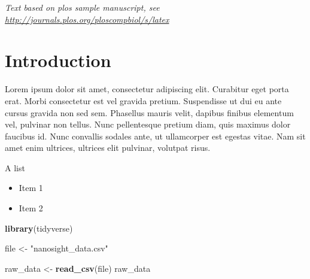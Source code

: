 \documentclass[10pt,letterpaper]{article}
\newenvironment{Shaded}{\begin{snugshade}}{\end{snugshade}}
\newcommand{\KeywordTok}[1]{\textcolor[rgb]{0.13,0.29,0.53}{\textbf{#1}}}
\newcommand{\StringTok}[1]{\textcolor[rgb]{0.31,0.60,0.02}{#1}}
\newcommand{\NormalTok}[1]{#1}
\providecommand{\tightlist}{%
  \setlength{\itemsep}{0pt}\setlength{\parskip}{0pt}}
\begin{document}
\linenumbers

\emph{Text based on plos sample manuscript, see
\url{http://journals.plos.org/ploscompbiol/s/latex}}

\section{Introduction}\label{introduction}

Lorem ipsum dolor sit amet, consectetur adipiscing elit. Curabitur eget
porta erat. Morbi consectetur est vel gravida pretium. Suspendisse ut
dui eu ante cursus gravida non sed sem. Phasellus mauris velit, dapibus
finibus elementum vel, pulvinar non tellus. Nunc pellentesque pretium
diam, quis maximus dolor faucibus id. Nunc convallis sodales ante, ut
ullamcorper est egestas vitae. Nam sit amet enim ultrices, ultrices elit
pulvinar, volutpat risus.

A list

\begin{itemize}
\tightlist
\item
  Item 1
\item
  Item 2
\end{itemize}

\begin{Shaded}
\begin{Highlighting}[]
\KeywordTok{library}\NormalTok{(tidyverse)}

\NormalTok{file <-}\StringTok{ "nanosight_data.csv"}


\NormalTok{raw_data <-}\StringTok{ }\KeywordTok{read_csv}\NormalTok{(file)}
\NormalTok{raw_data}
\end{Highlighting}
\end{Shaded}
\end{document}
